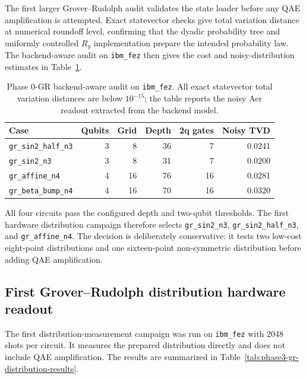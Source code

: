 The first larger Grover--Rudolph audit validates the state loader before any QAE
amplification is attempted. Exact statevector checks give total variation
distance at numerical roundoff level, confirming that the dyadic probability
tree and uniformly controlled \(R_y\) implementation prepare the intended
probability law. The backend-aware audit on \texttt{ibm\_fez} then gives the
cost and noisy-distribution estimates in Table~\ref{tab:phase0-gr-audit}.

\begin{table}[h]
\centering
\begin{tabular}{lrrrrr}
\toprule
Case & Qubits & Grid & Depth & 2q gates & Noisy TVD \\
\midrule
\texttt{gr\_sin2\_half\_n3} & 3 & 8 & 36 & 7 & 0.0241 \\
\texttt{gr\_sin2\_n3} & 3 & 8 & 31 & 7 & 0.0200 \\
\texttt{gr\_affine\_n4} & 4 & 16 & 76 & 16 & 0.0281 \\
\texttt{gr\_beta\_bump\_n4} & 4 & 16 & 70 & 16 & 0.0320 \\
\bottomrule
\end{tabular}
\caption{Phase 0-GR backend-aware audit on \texttt{ibm\_fez}. All exact
statevector total variation distances are below \(10^{-15}\); the table reports
the noisy Aer readout extracted from the backend model.}
\label{tab:phase0-gr-audit}
\end{table}

All four circuits pass the configured depth and two-qubit thresholds. The first
hardware distribution campaign therefore selects
\texttt{gr\_sin2\_n3}, \texttt{gr\_sin2\_half\_n3}, and
\texttt{gr\_affine\_n4}. The decision is deliberately conservative: it tests
two low-cost eight-point distributions and one sixteen-point non-symmetric
distribution before adding QAE amplification.

\subsection{First Grover--Rudolph distribution hardware readout}

The first distribution-measurement campaign was run on \texttt{ibm\_fez} with
2048 shots per circuit. It measures the prepared distribution directly and does
not include QAE amplification. The results are summarized in
Table~\ref{tab:phase3-gr-distribution-results}.

